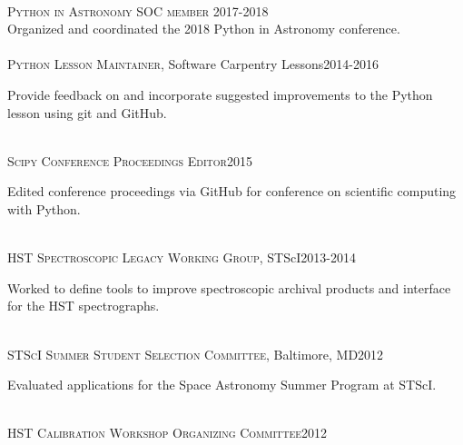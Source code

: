 \documentclass[10pt]{cv}
\begin{document}
\begin{llist}
%
\\
\textsc{Python in Astronomy SOC member} \hfill 2017-2018\\
Organized and coordinated the 2018 Python in Astronomy conference.\\
\\
\textsc{Python Lesson Maintainer}, Software Carpentry Lessons\hfill 2014-2016\\
\begin{minipage}[l]{0.7\textwidth}\vspace{0.15cm}
Provide feedback on and incorporate suggested improvements to the Python lesson using git and GitHub.\\
\end{minipage}\vspace{0.15cm}
\\
\textsc{Scipy Conference Proceedings Editor}\hfill 2015\\
\begin{minipage}[l]{0.7\textwidth}\vspace{0.15cm}
Edited conference proceedings via GitHub for conference on scientific computing with Python.\\
\end{minipage}\vspace{0.15cm}
\\
\textsc{HST Spectroscopic Legacy Working Group}, STScI\hfill2013-2014\\
\begin{minipage}[l]{0.7\textwidth}\vspace{0.15cm}
Worked to define tools to improve spectroscopic archival products and interface for the HST spectrographs.\\
\end{minipage}\vspace{0.15cm}
\\
\textsc{STScI Summer Student Selection Committee}, Baltimore, MD\hfill2012\\
\begin{minipage}[l]{0.7\textwidth}\vspace{0.15cm}
Evaluated applications for the Space Astronomy Summer Program at STScI.\\
\end{minipage}\vspace{0.15cm}
\\
\textsc{HST Calibration Workshop Organizing Committee}\hfill 2012\\
\begin{minipage}[l]{0.7\textwidth}\vspace{0.15cm}

\end{minipage}
\end{llist}
\end{document}
